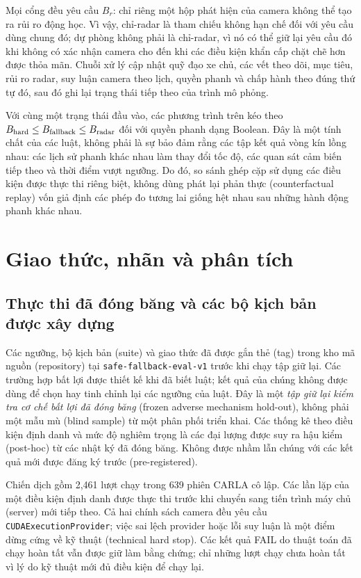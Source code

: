 \documentclass[conference]{IEEEtran}
\begin{document}
Mọi cổng đều yêu cầu $B_r$: chỉ riêng một hộp phát hiện của camera không thể
tạo ra rủi ro động học. Vì vậy, chỉ-radar là tham chiếu không hạn chế đối với
yêu cầu dùng chung đó; dự phòng không phải là chỉ-radar, vì nó có thể giữ lại
yêu cầu đó khi không có xác nhận camera cho đến khi các điều kiện khẩn cấp
chặt chẽ hơn được thỏa mãn. Chuỗi xử lý cập nhật quỹ đạo xe chủ, các vết theo
dõi, mục tiêu, rủi ro radar, suy luận camera theo lịch, quyền phanh và chấp
hành theo đúng thứ tự đó, sau đó ghi lại trạng thái tiếp theo của trình mô
phỏng.

Với cùng một trạng thái đầu vào, các phương trình trên kéo theo
$B_{\rm hard}\leq B_{\rm fallback}\leq B_{\rm radar}$ đối với quyền phanh dạng
Boolean. Đây là một tính chất của các luật, không phải là sự bảo đảm rằng các
tập kết quả vòng kín lồng nhau: các lịch sử phanh khác nhau làm thay đổi tốc
độ, các quan sát cảm biến tiếp theo và thời điểm vượt ngưỡng. Do đó, so sánh
ghép cặp sử dụng các điều kiện được thực thi riêng biệt, không dùng phát lại
phản thực (counterfactual replay) vốn giả định các phép đo tương lai giống hệt
nhau sau những hành động phanh khác nhau.

\section{Giao thức, nhãn và phân tích}
\subsection{Thực thi đã đóng băng và các bộ kịch bản được xây dựng}
Các ngưỡng, bộ kịch bản (suite) và giao thức đã được gắn thẻ (tag) trong kho
mã nguồn (repository) tại \texttt{safe-fallback-eval-v1} trước khi chạy tập
giữ lại. Các trường hợp bất lợi được thiết kế khi đã biết luật; kết quả của
chúng không được dùng để chọn hay tinh chỉnh lại các ngưỡng của luật. Đây là
một \emph{tập giữ lại kiểm tra cơ chế bất lợi đã đóng băng} (frozen adverse
mechanism hold-out), không phải một mẫu mù (blind sample) từ một phân phối
triển khai. Các thống kê theo điều kiện định danh và mức độ nghiêm trọng là
các đại lượng được suy ra hậu kiểm (post-hoc) từ các nhật ký đã đóng băng.
Không được nhầm lẫn chúng với các kết quả mới được đăng ký trước
(pre-registered).

Chiến dịch gồm 2,461 lượt chạy trong 639 phiên CARLA cô lập. Các lần lặp của
một điều kiện định danh được thực thi trước khi chuyển sang tiến trình máy
chủ (server) mới tiếp theo. Cả hai chính sách camera đều yêu cầu
\texttt{CUDAExecutionProvider}; việc sai lệch provider hoặc lỗi suy luận là
một điểm dừng cứng về kỹ thuật (technical hard stop). Các kết quả FAIL do
thuật toán đã chạy hoàn tất vẫn được giữ làm bằng chứng; chỉ những lượt chạy
chưa hoàn tất vì lý do kỹ thuật mới đủ điều kiện để chạy lại.
\end{document}
